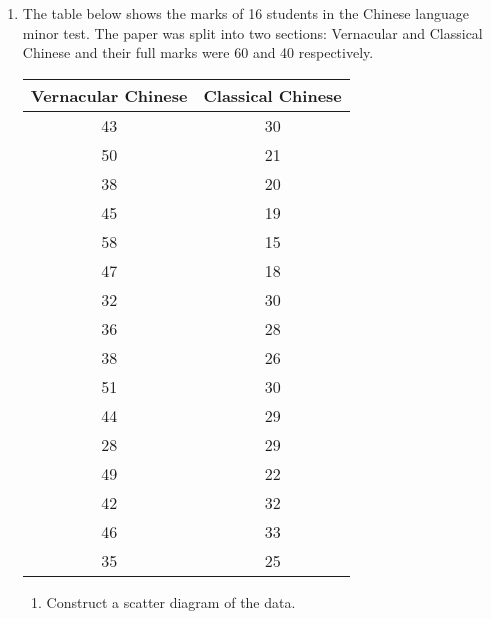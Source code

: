\documentclass{report}
\begin{document}
\begin{multicols}{2}
\begin{enumerate}
    \item The table below shows the marks of 16 students in the Chinese language minor
          test. The paper was split into two sections: Vernacular and Classical Chinese
          and their full marks were 60 and 40 respectively.
          \begin{center}
            \begin{tabular}{|c|c|}
              \hline
              Vernacular Chinese & Classical Chinese \\
              \hline
              43                 & 30                \\
              50                 & 21                \\
              38                 & 20                \\
              45                 & 19                \\
              58                 & 15                \\
              47                 & 18                \\
              32                 & 30                \\
              36                 & 28                \\
              38                 & 26                \\
              51                 & 30                \\
              44                 & 29                \\
              28                 & 29                \\
              49                 & 22                \\
              42                 & 32                \\
              46                 & 33                \\
              35                 & 25                \\
              \hline
            \end{tabular}
          \end{center}
          \begin{enumerate}
            \item Construct a scatter diagram of the data. \sol{}
                  \begin{center}
                    \resizebox{\columnwidth-4.6em}{!}{%
                      \begin{tikzpicture}

\end{tikzpicture}}
\end{center}
\end{enumerate}
\end{enumerate}
\end{multicols}
\end{document}
